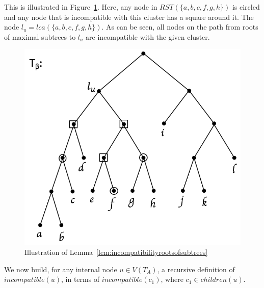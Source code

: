 \documentclass{article}
\begin{document}
    This is illustrated in Figure~\ref{fig:rootsofsubtrees}. Here, any node in $RST(\{a, b, c, f, g, h\})$ is circled and any node that is incompatible with this cluster has a square around it. The node $l_u = lca(\{a, b, c, f, g, h\})$. As can be seen, all nodes on the path from roots of maximal subtrees to $l_u$ are incompatible with the given cluster.

    \begin{figure}[h]
        \includegraphics[scale=0.5]{rootsofsubtrees}
        \centering
        \caption{Illustration of Lemma~\ref{lem:incompatibilityrootsofsubtrees}}
        \label{fig:rootsofsubtrees}
    \end{figure}

    We now build, for any internal node $u \in V(T_A)$, a recursive definition of $incompatible(u)$, in terms of $incompatible(c_1)$, where $c_1 \in children(u)$.
    \newline
\end{document}
